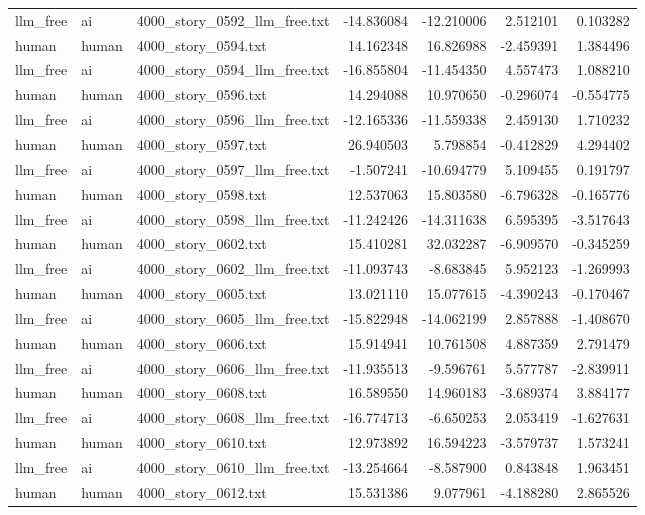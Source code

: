\begin{longtable}{lllrrrr}
llm\_free & ai & 4000\_story\_0592\_llm\_free.txt & -14.836084 & -12.210006 & 2.512101 & 0.103282 \\
human & human & 4000\_story\_0594.txt & 14.162348 & 16.826988 & -2.459391 & 1.384496 \\
llm\_free & ai & 4000\_story\_0594\_llm\_free.txt & -16.855804 & -11.454350 & 4.557473 & 1.088210 \\
human & human & 4000\_story\_0596.txt & 14.294088 & 10.970650 & -0.296074 & -0.554775 \\
llm\_free & ai & 4000\_story\_0596\_llm\_free.txt & -12.165336 & -11.559338 & 2.459130 & 1.710232 \\
human & human & 4000\_story\_0597.txt & 26.940503 & 5.798854 & -0.412829 & 4.294402 \\
llm\_free & ai & 4000\_story\_0597\_llm\_free.txt & -1.507241 & -10.694779 & 5.109455 & 0.191797 \\
human & human & 4000\_story\_0598.txt & 12.537063 & 15.803580 & -6.796328 & -0.165776 \\
llm\_free & ai & 4000\_story\_0598\_llm\_free.txt & -11.242426 & -14.311638 & 6.595395 & -3.517643 \\
human & human & 4000\_story\_0602.txt & 15.410281 & 32.032287 & -6.909570 & -0.345259 \\
llm\_free & ai & 4000\_story\_0602\_llm\_free.txt & -11.093743 & -8.683845 & 5.952123 & -1.269993 \\
human & human & 4000\_story\_0605.txt & 13.021110 & 15.077615 & -4.390243 & -0.170467 \\
llm\_free & ai & 4000\_story\_0605\_llm\_free.txt & -15.822948 & -14.062199 & 2.857888 & -1.408670 \\
human & human & 4000\_story\_0606.txt & 15.914941 & 10.761508 & 4.887359 & 2.791479 \\
llm\_free & ai & 4000\_story\_0606\_llm\_free.txt & -11.935513 & -9.596761 & 5.577787 & -2.839911 \\
human & human & 4000\_story\_0608.txt & 16.589550 & 14.960183 & -3.689374 & 3.884177 \\
llm\_free & ai & 4000\_story\_0608\_llm\_free.txt & -16.774713 & -6.650253 & 2.053419 & -1.627631 \\
human & human & 4000\_story\_0610.txt & 12.973892 & 16.594223 & -3.579737 & 1.573241 \\
llm\_free & ai & 4000\_story\_0610\_llm\_free.txt & -13.254664 & -8.587900 & 0.843848 & 1.963451 \\
human & human & 4000\_story\_0612.txt & 15.531386 & 9.077961 & -4.188280 & 2.865526 \\

\end{longtable}
